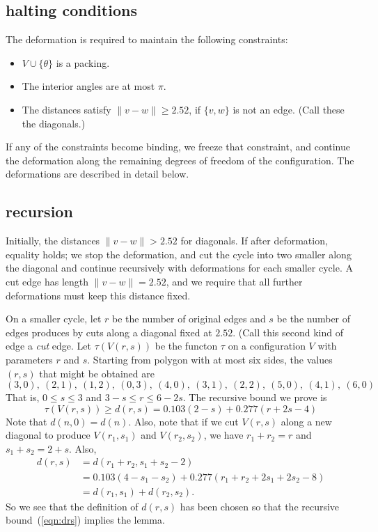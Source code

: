 \subsection{halting conditions}

The deformation is required to maintain the following
constraints:
\begin{itemize}
\item $V\cup\{\theta\}$ is a packing.
\item The interior angles are at most $\pi$.
\item The distances satisfy $\|v-w\|\ge 2.52$, if $\{v,w\}$ is
not an edge.  (Call these the diagonals.)
\end{itemize}
If any of the constraints become binding, we freeze that
constraint, and continue the deformation along the remaining degrees of freedom of the configuration.  The deformations are described in detail below.

\subsection{recursion}

Initially, the distances $\|v-w\|>2.52$ for diagonals.
If after deformation, equality holds; we stop the deformation, and cut the cycle into two smaller along the diagonal
and continue recursively with deformations for each smaller cycle.  A cut edge has length $\|v-w\|=2.52$, and
we require that all further deformations must keep this distance fixed.  

On a smaller cycle, let $r$ be the number of original edges and $s$ be the number of edges produces by cuts along a diagonal fixed at $2.52$.  (Call this second kind of edge a {\it cut} edge.  Let $\tau(V(r,s))$ be the functon $\tau$ on a configuration $V$ with parameters $r$ and $s$.  Starting from polygon with at most six sides, the values $(r,s)$ that might be obtained are
$$
(3,0),~(2,1),~(1,2),~(0,3),~
(4,0),~(3,1),~(2,2),~
(5,0),~(4,1),~
(6,0)
$$
That is, $0\le s\le 3$ and $3-s\le r\le 6-2s$.
The recursive bound we prove is
\begin{equation}\label{eqn:drs}
\tau(V(r,s)) \ge d(r,s) = 0.103 (2-s) + 0.277 (r+2s-4) 
\end{equation}
Note that $d(n,0) = d(n)$. Also, note that if we cut
$V(r,s)$ along a new diagonal to produce $V(r_1,s_1)$
and $V(r_2,s_2)$, we have $r_1+r_2=r$ and $s_1+s_2 = 2+s$.
Also,
$$
\begin{array}{lll}
d(r,s) &= d(r_1+r_2,s_1+s_2-2) \\
  &=0.103 (4-s_1-s_2) + 0.277 (r_1+r_2+2s_1+2s_2-8) \\
  &=d(r_1,s_1) + d(r_2,s_2).
\end{array}
$$
So we see that the definition of $d(r,s)$ has been
chosen so that the recursive 
bound~(\ref{eqn:drs}) implies the
lemma.


